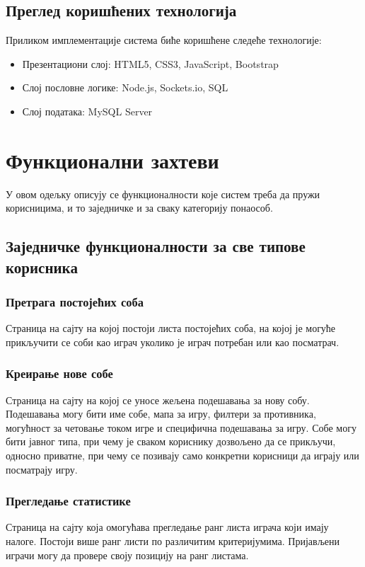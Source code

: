 \subsection{Преглед коришћених технологија}
Приликом имплементације система биће коришћене следеће технологије:
\begin{itemize}
    \item Презентациони слој: HTML5, CSS3, JavaScript, Bootstrap
    \item Слој пословне логике: Node.js, Sockets.io, SQL
    \item Слој података: MySQL Server
\end{itemize}



\section{Функционални захтеви} 
У овом одељку описују се функционалности које систем треба да пружи корисницима, и то заједничке и за сваку
категорију понаособ.

\subsection{Заједничке функционалности за све типове корисника}

\subsubsection{Претрага постојећих соба}
Страница на сајту на којој постоји листа постојећих соба, на којој је могуће прикључити се соби као играч уколико
је играч потребан или као посматрач.

\subsubsection{Креирање нове собе}
Страница на сајту на којој се уносе жељена подешавања за нову собу. Подешавања могу бити име собе, мапа за игру,
филтери за противника, могућност за четовање током игре и специфична подешавања за игру. Собе могу бити јавног
типа, при чему је сваком кориснику дозвољено да се прикључи, односно приватне, при чему се позивају само конкретни
корисници да играју или посматрају игру.

\subsubsection{Прегледање статистике}
Страница на сајту која омогућава прегледање ранг листа играча који имају налоге. Постоји више ранг листи по
различитим критеријумима. Пријављени играчи могу да провере своју позицију на ранг листама.

